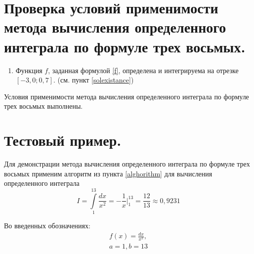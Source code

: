 \documentclass[a4paper, 12pt]{article}
\begin{document}
	\section{Проверка условий применимости метода вычисления определенного интеграла по формуле трех восьмых.}
	
	\begin{enumerate}
		\item Функция $f$, заданная формулой \eqref{f}, определена и интегрируема на отрезке $[-3,0;0,7]$. (см. пункт \ref{solexistance})
	\end{enumerate}
	
	Условия применимости метода вычисления определенного интеграла по формуле трех восьмых выполнены.
	
	\section{Тестовый пример.}
	
	Для демонстрации метода вычисления определенного интеграла по формуле трех восьмых применим алгоритм из пункта \ref{alghorithm} для вычисления определенного интеграла
	\begin{equation}
		I=\int\limits_1^{13}\frac{dx}{x^2}=-\frac{1}{x}\bigg|_1^{13}=\frac{12}{13}\approx0,9231
	\end{equation}

	Во введенных обозначениях:
	\begin{equation*}
		\begin{gathered}
		f(x)=\frac{dx}{x^2},\\
		a=1, b=13
		\end{gathered}
	\end{equation*}
	
\end{document}
